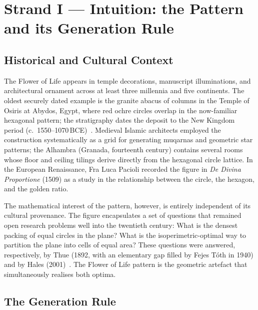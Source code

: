 \section{Strand I — Intuition: the Pattern and its Generation Rule}
\label{sec:fol-strand1}

\subsection{Historical and Cultural Context}
\label{subsec:fol-history}

The Flower of Life appears in temple decorations, manuscript illuminations,
and architectural ornament across at least three millennia and five
continents.  The oldest securely dated example is the granite abacus of
columns in the Temple of Osiris at Abydos, Egypt, where red ochre circles
overlap in the now-familiar hexagonal pattern; the stratigraphy dates the
deposit to the New Kingdom period (c.\ 1550–1070\,BCE)~\cite{coxeter_intro_geometry}.
Medieval Islamic architects employed the construction systematically as a
grid for generating muqarnas and geometric star patterns; the Alhambra
(Granada, fourteenth century) contains several rooms whose floor and
ceiling tilings derive directly from the hexagonal circle lattice.
In the European Renaissance, Fra Luca Pacioli recorded the figure in
\emph{De Divina Proportione} (1509) as a study in the relationship between
the circle, the hexagon, and the golden ratio.

The mathematical interest of the pattern, however, is entirely independent
of its cultural provenance.  The figure encapsulates a set of questions
that remained open research problems well into the twentieth century:
What is the densest packing of equal circles in the plane?  What is the
isoperimetric-optimal way to partition the plane into cells of equal area?
These questions were answered, respectively, by Thue (1892, with
an elementary gap filled by Fejes Tóth in 1940) and by Hales
(2001)~\cite{hales_honeycomb,conway_sphere_packings}.  The Flower of Life
pattern is the geometric artefact that simultaneously realises both optima.

\subsection{The Generation Rule}
\label{subsec:fol-generation}


